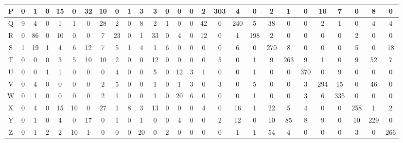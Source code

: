 \begin{tabular}{|c|c|c|c|c|c|c|c|c|c|c|c|c|c|c|c|c|c|c|c|c|c|c|c|c|c|c|}
  P & 0 & 1 & 0 & 15 & 0 & 32 & 10 & 0 & 1 & 3 & 3 & 0 & 0 & 0 & 2 & 303 & 4 & 0 & 2 & 1 & 0 & 10 & 7 & 0 & 8 & 0 \\ \hline
  Q & 9 & 4 & 0 & 1 & 1 & 0 & 28 & 2 & 0 & 8 & 2 & 1 & 0 & 0 & 42 & 0 & 240 & 5 & 38 & 0 & 0 & 2 & 1 & 0 & 4 & 4 \\ \hline
  R & 0 & 86 & 0 & 10 & 0 & 0 & 7 & 23 & 0 & 1 & 33 & 0 & 4 & 0 & 12 & 0 & 1 & 198 & 2 & 0 & 0 & 0 & 0 & 2 & 0 & 0 \\ \hline
  S & 1 & 19 & 1 & 4 & 6 & 12 & 7 & 5 & 1 & 4 & 1 & 6 & 0 & 0 & 0 & 0 & 6 & 0 & 270 & 8 & 0 & 0 & 0 & 5 & 0 & 18 \\ \hline
  T & 0 & 0 & 0 & 3 & 5 & 10 & 10 & 2 & 0 & 0 & 12 & 0 & 0 & 0 & 0 & 5 & 0 & 1 & 9 & 263 & 9 & 1 & 0 & 9 & 52 & 7 \\ \hline
  U & 0 & 0 & 1 & 1 & 0 & 0 & 0 & 4 & 0 & 0 & 5 & 0 & 12 & 3 & 1 & 0 & 0 & 1 & 0 & 0 & 370 & 0 & 9 & 0 & 0 & 0 \\ \hline
  V & 0 & 4 & 0 & 0 & 0 & 0 & 2 & 5 & 0 & 0 & 1 & 0 & 1 & 3 & 0 & 3 & 0 & 5 & 0 & 0 & 3 & 294 & 15 & 0 & 46 & 0 \\ \hline
  W & 0 & 1 & 0 & 0 & 0 & 0 & 2 & 1 & 0 & 0 & 1 & 0 & 20 & 6 & 0 & 0 & 0 & 1 & 0 & 0 & 3 & 6 & 335 & 0 & 0 & 0 \\ \hline
  X & 0 & 4 & 0 & 15 & 10 & 0 & 27 & 1 & 8 & 3 & 13 & 0 & 0 & 0 & 4 & 0 & 16 & 1 & 22 & 5 & 4 & 0 & 0 & 258 & 1 & 2 \\ \hline
  Y & 0 & 1 & 0 & 4 & 0 & 17 & 0 & 1 & 0 & 1 & 0 & 0 & 4 & 0 & 0 & 2 & 12 & 0 & 10 & 85 & 8 & 9 & 0 & 10 & 229 & 0 \\ \hline
  Z & 0 & 1 & 2 & 2 & 10 & 1 & 0 & 0 & 0 & 20 & 0 & 2 & 0 & 0 & 0 & 0 & 1 & 1 & 54 & 4 & 0 & 0 & 0 & 3 & 0 & 266 \\ \hline
\end{tabular}

